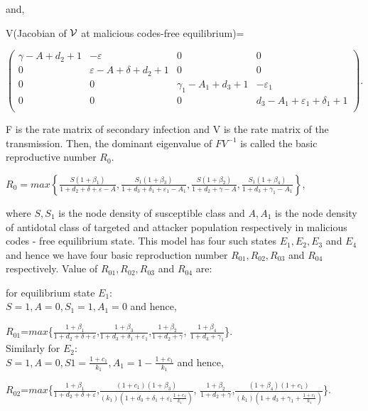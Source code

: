 \noindent and,

\noindent V(Jacobian of $\cal{V}$  at malicious codes-free equilibrium)=

 $\left(
   \begin{array}{cccc}
     \gamma-A+d_2+1 & -\varepsilon & 0 & 0 \\
     0 & \varepsilon-A+\delta+d_2+1 & 0 & 0 \\
     0 & 0 & {\gamma}_1-A_1+d_3+1 & -{\varepsilon}_1 \\
     0 & 0 & 0 & d_3-A_1+{\varepsilon}_1+{\delta}_1+1 \\
   \end{array}
 \right).$

F is the rate matrix of secondary infection and V is the rate matrix of the transmission. Then, the dominant eigenvalue of $FV^{-1}$ is called the basic reproductive number $R_0$.

$R_0 = max\left\{\frac{S(1+{\beta}_1)}{1+d_2+\delta+\varepsilon-A},\frac{S_1(1+{\beta}_3)}{1+d_3+{\delta}_1+{\varepsilon}_1-A_1},
\frac{S(1+{\beta}_2)}{1+d_2+\gamma-A},\frac{S_1(1+{\beta}_4)}{1+d_3+{\gamma}_1-A_1}\right\},$

\noindent where $S, S_1$ is the node density of susceptible class and $A, A_1$ is the node density of antidotal class of targeted and attacker population respectively in malicious codes - free equilibrium state. This model has four such states $E_1, E_2, E_3$ and $E_4$ and hence we have four basic reproduction number $R_{01}, R_{02}, R_{03}$ and $R_{04}$ respectively.
Value of $R_{01}, R_{02}, R_{03}$ and $R_{04}$ are:

\noindent for equilibrium state $E_1:$\\
$S=1,A=0,S_1=1,A_1=0$ and hence,

$R_{01}$=$max$\{$\frac{1+{\beta}_1}{1+d_2+\delta+\varepsilon}$,$\frac{1+{\beta}_3}{1+d_3+{\delta}_1+{\varepsilon}_1}$,$\frac{1+{\beta}_2}{1+d_2+\gamma}$,
$\frac{1+{\beta}_4}{1+d_3+{\gamma}_1}$\}.\\

\noindent Similarly for $E_2:$\\
$S=1,A=0,S1=\frac{1+c_1}{k_1},A_1=1-\frac{1+c_1}{k_1}$ and hence,

$R_{02}$=$max$\{$\frac{1+{\beta}_1}{1+d_2+\delta+\varepsilon}$,$\frac{(1+c_1)(1+{\beta}_3)}{(k_1)(1+d_3+{\delta}_1+{\varepsilon}_1\frac{1+c_1}{k_1})}$,
$\frac{1+{\beta}_2}{1+d_2+\gamma}$,$\frac{(1+{\beta}_4)(1+c_1)}{(k_1)(1+d_3+{\gamma}_1+\frac{1+c_1}{k_1})}$\}.\\

